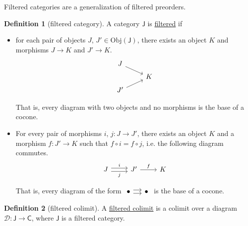 \documentclass[a4paper,10pt]{scrreprt}
\newcommand{\defn}[1]{\ul{#1}}
\newcommand{\Obj}{\mathrm{Obj}}
\theoremstyle{definition}
\newtheorem{definition}{Definition}[section]
\theoremstyle{plain}
\theoremstyle{remark}
\begin{document}
Filtered categories are a generalization of filtered preorders.

\begin{definition}[filtered category]
  \label{def:filteredcategory}
  A category $\mathsf{J}$ is \defn{filtered} if
  \begin{itemize}
    \item for each pair of objects $J$, $J' \in \Obj(\mathsf{J})$, there exists an object $K$ and morphisms $J \to K$ and $J' \to K$.
      \begin{equation*}
        \begin{tikzcd}[row sep=tiny]
          J
          \arrow[dr]
          \\
          & K
          \\
          J'
          \arrow[ur]
        \end{tikzcd}
      \end{equation*}

      That is, every diagram with two objects and no morphisms is the base of a cocone.

    \item For every pair of morphisms $i$, $j\colon J \to J'$, there exists an object $K$ and a morphism $f\colon J' \to K$ such that $f \circ i = f \circ j$, i.e. the following diagram commutes.
      \begin{equation*}
        \begin{tikzcd}[row sep=tiny]
          J
          \arrow[r, shift left, "i"]
          \arrow[r, shift right, swap, "j"]
          & J'
          \arrow[r, "f"]
          & K
        \end{tikzcd}
      \end{equation*}

      That is, every diagram of the form $\begin{tikzcd}[column sep=small]\bullet \arrow[r, shift left] \arrow[r, shift right] & \bullet \end{tikzcd}$ is the base of a cocone.
  \end{itemize}
\end{definition}

\begin{definition}[filtered colimit]
  \label{def:filteredcolimit}
  A \defn{filtered colimit} is a colimit over a diagram $\mathcal{D}\colon \mathsf{J} \to \mathsf{C}$, where $\mathsf{J}$ is a filtered category.
\end{definition}
\end{document}
